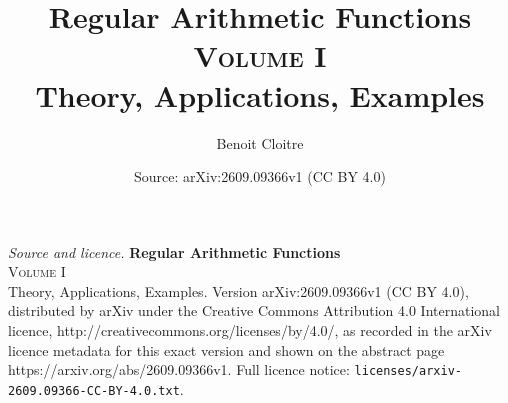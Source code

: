 \documentclass[10pt,a4paper]{amsart}
\title{\Huge \textbf{Regular Arithmetic Functions}\\ \vspace{1.4em} \huge \textsc{Volume I}\\ \vspace{0.7em} \Large Theory, Applications, Examples}
\author{Benoit Cloitre}
\date{Source: arXiv:2609.09366v1 (CC BY 4.0)}
\begin{document}
\maketitle

\noindent\emph{Source and licence.} \Huge \textbf{Regular Arithmetic Functions}\\ \vspace{1.4em} \huge \textsc{Volume I}\\ \vspace{0.7em} \Large Theory, Applications, Examples. Version arXiv:2609.09366v1 (CC BY 4.0), distributed by arXiv under the Creative Commons Attribution 4.0 International licence, http://creativecommons.org/licenses/by/4.0/, as recorded in the arXiv licence metadata for this exact version and shown on the abstract page https://arxiv.org/abs/2609.09366v1. Full licence notice: \texttt{licenses/arxiv-2609.09366-CC-BY-4.0.txt}.\par\smallskip
\end{document}
